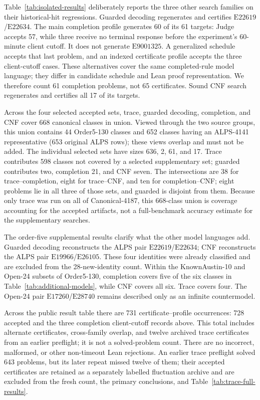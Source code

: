 \documentclass[runningheads]{llncs}
\newcommand{\Law}[1]{\ensuremath{\mathrm{E}#1}}
\begin{document}
Table~\ref{tab:isolated-results} deliberately reports the three other search
families on their historical-hit regressions.  Guarded decoding regenerates
and certifies \Law{22619}/\Law{22634}.  The main completion profile generates
60 of its 61 targets: Judge accepts 57, while three receive no terminal response
before the experiment's 60-minute client cutoff.  It does not generate
\Law{9001325}.  A generalized schedule accepts that last problem, and an
indexed certificate profile accepts the three client-cutoff cases.  These
alternatives cover the same completed-rule model language; they differ in
candidate schedule and Lean proof representation.  We therefore count 61
completion problems, not 65 certificates.  Sound CNF search regenerates and
certifies all 17 of its targets.

Across the four selected accepted sets, trace, guarded decoding, completion,
and CNF cover 668 canonical classes in union.  Viewed through the two source
groups, this union contains 44 Order5-130 classes and 652 classes having an
ALPS-4141 representative (653 original ALPS rows); these views overlap and
must not be added.  The individual selected sets have sizes 636, 2, 61, and 17.
Trace contributes 598 classes not covered by a selected supplementary set;
guarded contributes two, completion 21, and CNF seven.  The intersections are
38 for trace--completion, eight for trace--CNF, and ten for completion--CNF;
eight problems lie in all three of those sets, and guarded is disjoint from
them.  Because only trace was run on all of Canonical-4187, this 668-class
union is coverage accounting for the accepted artifacts, not a full-benchmark
accuracy estimate for the supplementary searches.

The order-five supplemental results clarify what the other model languages
add.  Guarded decoding reconstructs the ALPS pair
\Law{22619}/\Law{22634}; CNF reconstructs the ALPS pair
\Law{19966}/\Law{26105}.  These four identities were already classified and
are excluded from the 28-new-identity count.  Within the KnownAustin-10 and
Open-24 subsets of Order5-130, completion covers five of the six classes in
Table~\ref{tab:additional-models}, while CNF
covers all six.  Trace covers four.  The Open-24 pair
\Law{17260}/\Law{28740} remains described only as an infinite countermodel.



Across the public result table there are 731 certificate--profile occurrences:
728 accepted and the three completion client-cutoff records above.  This total
includes alternate certificates, cross-family overlap, and twelve archived
trace certificates from an earlier preflight; it is not a solved-problem
count.  There are no incorrect, malformed, or other non-timeout Lean
rejections.  An earlier trace preflight solved 643 problems, but its later
repeat missed twelve of them; their accepted certificates are retained as a
separately labelled fluctuation archive and are excluded from the fresh count,
the primary conclusions, and Table~\ref{tab:trace-full-results}.
\end{document}
